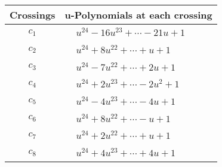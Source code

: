 \documentclass[1p]{elsarticle_modified}
\theoremstyle{definition}
\begin{document}
\begin{tabular}{m{50pt}|m{274pt}}
Crossings & \hspace{64pt}u-Polynomials at each crossing \\
\hline $$\begin{aligned}c_{1}\end{aligned}$$&$\begin{aligned}
&u^{24}-16 u^{23}+\cdots-21 u+1
\end{aligned}$\\
\hline $$\begin{aligned}c_{2}\end{aligned}$$&$\begin{aligned}
&u^{24}+8 u^{22}+\cdots+u+1
\end{aligned}$\\
\hline $$\begin{aligned}c_{3}\end{aligned}$$&$\begin{aligned}
&u^{24}-7 u^{22}+\cdots+2 u+1
\end{aligned}$\\
\hline $$\begin{aligned}c_{4}\end{aligned}$$&$\begin{aligned}
&u^{24}+2 u^{23}+\cdots-2 u^2+1
\end{aligned}$\\
\hline $$\begin{aligned}c_{5}\end{aligned}$$&$\begin{aligned}
&u^{24}-4 u^{23}+\cdots-4 u+1
\end{aligned}$\\
\hline $$\begin{aligned}c_{6}\end{aligned}$$&$\begin{aligned}
&u^{24}+8 u^{22}+\cdots- u+1
\end{aligned}$\\
\hline $$\begin{aligned}c_{7}\end{aligned}$$&$\begin{aligned}
&u^{24}+2 u^{22}+\cdots+u+1
\end{aligned}$\\
\hline $$\begin{aligned}c_{8}\end{aligned}$$&$\begin{aligned}
&u^{24}+4 u^{23}+\cdots+4 u+1
\end{aligned}$\\

\end{tabular}
\end{document}
